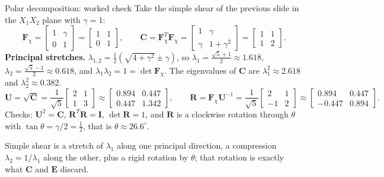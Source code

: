 \documentclass[aspectratio=169,11pt]{beamer}
\newcommand{\I}{\bm{I}}
\newcommand{\Fdef}{\bm{F}_{\chi}}
\newcommand{\Cten}{\bm{C}}
\newcommand{\Eten}{\bm{E}}
\begin{document}
\begin{frame}{Polar decomposition: worked check}
\footnotesize
Take the simple shear of the previous slide in the \(X_1X_2\) plane with \(\gamma=1\):
\[
  \Fdef=
  \begin{bmatrix}1&\gamma\\0&1\end{bmatrix}
  =\begin{bmatrix}1&1\\0&1\end{bmatrix},
  \qquad
  \Cten=\Fdef^T\Fdef=
  \begin{bmatrix}1&\gamma\\\gamma&1+\gamma^2\end{bmatrix}
  =\begin{bmatrix}1&1\\1&2\end{bmatrix}.
\]
\textbf{Principal stretches.}
\(\lambda_{1,2}=\frac12\left(\sqrt{4+\gamma^2}\pm\gamma\right)\), so
\(\lambda_1=\frac{\sqrt5+1}{2}\approx1.618\),
\(\lambda_2=\frac{\sqrt5-1}{2}\approx0.618\),
and \(\lambda_1\lambda_2=1=\det\Fdef\).
The eigenvalues of \(\Cten\) are \(\lambda_1^2\approx2.618\) and \(\lambda_2^2\approx0.382\).
\[
  \bm{U}=\sqrt{\Cten}=\frac{1}{\sqrt5}
  \begin{bmatrix}2&1\\1&3\end{bmatrix}
  \approx
  \begin{bmatrix}0.894&0.447\\0.447&1.342\end{bmatrix},
  \qquad
  \bm{R}=\Fdef\bm{U}^{-1}=\frac{1}{\sqrt5}
  \begin{bmatrix}2&1\\-1&2\end{bmatrix}
  \approx
  \begin{bmatrix}0.894&0.447\\-0.447&0.894\end{bmatrix}.
\]
Checks: \(\bm{U}^2=\Cten\), \(\bm{R}^T\bm{R}=\I\), \(\det\bm{R}=1\), and \(\bm{R}\) is a clockwise rotation through \(\theta\) with \(\tan\theta=\gamma/2=\tfrac12\), that is \(\theta\approx26.6^\circ\).
\medskip
\begin{punchbox}
\footnotesize
Simple shear is a stretch of \(\lambda_1\) along one principal direction, a compression \(\lambda_2=1/\lambda_1\) along the other, plus a rigid rotation by \(\theta\); that rotation is exactly what \(\Cten\) and \(\Eten\) discard.
\end{punchbox}
\end{frame}
\end{document}
